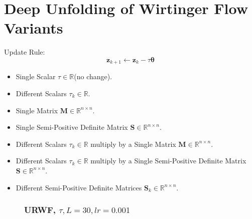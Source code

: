 \documentclass{beamer}
\theoremstyle{definition}
\theoremstyle{remark}
\begin{document}
\section[DU/AU of WF*]{Deep Unfolding of Wirtinger Flow Variants}
\begin{frame}
  Update Rule:
  \begin{equation*}
    \boldsymbol{z}_{k+1} \leftarrow \boldsymbol{z}_k - \tau\boldsymbol{\theta}
  \end{equation*}

  
  
  \begin{itemize}[<+->]
    \item Single Scalar $\tau \in \mathbb{R}$(no change).
    \item Different Scalars $\tau_k\in\mathbb{R}$.
    \item Single Matrix $\boldsymbol{M}\in \mathbb{R}^{n\times n}$.
    \item Single Semi-Positive Definite Matrix $\boldsymbol{S}\in \mathbb{R}^{n\times n}$.
    \item Different Scalars $\tau_k \in \mathbb{R}$ multiply by a Single Matrix $\boldsymbol{M} \in \mathbb{R}^{n\times n}$.
    \item Different Scalars $\tau_k \in \mathbb{R}$ multiply by a Single Semi-Positive Definite Matrix $\boldsymbol{S} \in \mathbb{R}^{n\times n}$.
    \item Different Semi-Positive Definite Matrices $\boldsymbol{S}_k\in \mathbb{R}^{n\times n}$.
  \end{itemize}
\end{frame}
\begin{frame}
  \begin{figure}
    \frametitle{URWF, $\tau,L=30,lr=0.001$}
    \centering
    \resizebox{0.9\textwidth}{!}{}
    \label{fig:rwf_s_00_l_30_lr_0.001}
  \end{figure}
\end{frame}
\end{document}
